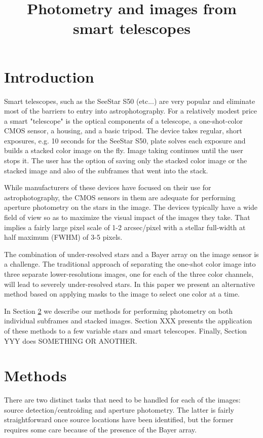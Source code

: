 \documentclass[12pt]{article}
\begin{document}
\title{Photometry and images from smart telescopes}

\section{Introduction}

Smart telescopes, such as the SeeStar S50 (etc...) are very popular and eliminate
most of the barriers to entry into astrophotography. For a relatively modest price
a smart "telescope" is the optical components of a telescope, a one-shot-color
CMOS sensor, a housing, and a basic tripod. The device takes regular, short
exposures, e.g. 10 seconds for the SeeStar S50, plate solves each exposure and
builds a stacked color image on the fly. Image taking continues until the user
stops it. The user has the option of saving only the stacked color image or the
stacked image and also of the subframes that went into the stack.

While manufacturers of these devices have focused on their use for
astrophotography, the CMOS sensors in them are adequate for performing aperture
photometry on the stars in the image. The devices typically have a wide field
of view so as to maximize the visual impact of the images they take. That implies
a fairly large pixel scale of 1-2 arcsec/pixel with a stellar full-width at half maximum (FWHM) of 3-5 pixels.

The combination of under-resolved stars and a Bayer array on the image sensor is a challenge. The traditional
approach of separating the one-shot color image into three separate lower-resolutions images, one for each
of the three color channels, will lead to severely under-resolved stars. In this paper we present an
alternative method based on applying masks to the image to select one color at a time.

In Section \ref{sec:method} we describe our methods for performing photometry on
both individual subframes and stacked images. Section XXX presents the application of these methods to a few variable stars and smart telescopes. Finally, Section YYY does SOMETHING OR ANOTHER.

\section{Methods} \label{sec:method}

There are two distinct tasks that need to be handled for each of the images: source detection/centroiding and
aperture photometry. The latter is fairly straightforward once source locations have been identified, but
the former requires some care because of the presence of the Bayer array.
\end{document}
